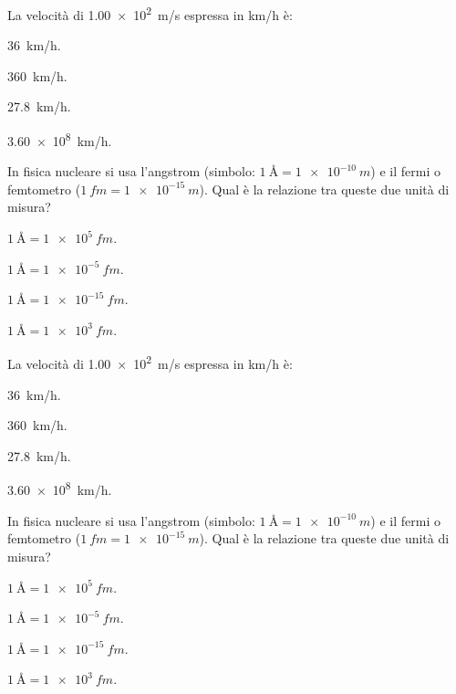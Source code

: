 \documentclass{article}
\begin{document}
\begin{enumext}[mode-box,columns=2,columns-sep=1cm,save-ans=sabastiano]
 \item La velocità di \qty{1,00e2}{m/s} espressa in \unit{km/h} è:
   \begin{keyans}
     \item \qty{36}{km/h}.
     \item* \qty{360}{km/h}.
     \item \qty{27,8}{km/h}.
     \item \qty{3,60e8}{km/h}.
   \end{keyans}

 \item In fisica nucleare si usa l'angstrom (simbolo:
 $\qty{1}{\angstrom} = \qty{1e-10}{m}$) e il fermi o femtometro
 ($\qty{1}{fm} = \qty{1e-15}{m}$). Qual è la relazione tra queste due
 unità di misura?
   \begin{keyans}
     \item* $\qty{1}{\angstrom}=\qty{1e5}{fm}$.
     \item $\qty{1}{\angstrom}=\qty{1e-5}{fm}$.
     \item $\qty{1}{\angstrom}=\qty{1e-15}{fm}$.
     \item $\qty{1}{\angstrom}=\qty{1e3}{fm}$.
   \end{keyans}

 \item La velocità di \qty{1,00e2}{m/s} espressa in \unit{km/h} è:
   \begin{keyans}
     \item \qty{36}{km/h}.
     \item* \qty{360}{km/h}.
     \item \qty{27,8}{km/h}.
     \item \qty{3,60e8}{km/h}.
   \end{keyans}

 \item In fisica nucleare si usa l'angstrom (simbolo:
 $\qty{1}{\angstrom} = \qty{1e-10}{m}$) e il fermi o femtometro
 ($\qty{1}{fm} = \qty{1e-15}{m}$). Qual è la relazione tra queste due
 unità di misura?
   \begin{keyans}
     \item* $\qty{1}{\angstrom}=\qty{1e5}{fm}$.
     \item $\qty{1}{\angstrom}=\qty{1e-5}{fm}$.
     \item $\qty{1}{\angstrom}=\qty{1e-15}{fm}$.
     \item $\qty{1}{\angstrom}=\qty{1e3}{fm}$.
   \end{keyans}
\end{enumext}

\end{document}
